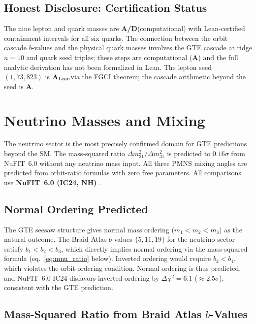 \documentclass[11pt,openany]{book}
\theoremstyle{remark}
\newcommand{\CatA}{\textbf{A}}
\newcommand{\CatAL}{\ensuremath{\textbf{A}_{\rm Lean}}}
\newcommand{\CatAD}{\textbf{A/D}}
\begin{document}
\subsection*{Honest Disclosure: Certification Status}

The nine lepton and quark masses are \CatAD (computational) with Lean-certified
containment intervals for all six quarks.  The connection between the orbit cascade
$b$-values and the physical quark masses involves the GTE cascade at ridge $n=10$
and quark seed triples; these steps are computational (\CatA) and the full analytic
derivation has not been formalized in Lean.  The lepton seed $(1,73,823)$ is
\CatAL via the FGCI theorem; the cascade arithmetic beyond the seed is \CatA.

\section{Neutrino Masses and Mixing}
\label{sec:neutrinos}

The neutrino sector is the most precisely confirmed domain for GTE predictions beyond
the SM.  The mass-squared ratio $\Delta m^2_{21}/\Delta m^2_{31}$ is predicted to
$0.16\sigma$ from NuFIT~6.0 without any neutrino mass input.  All three PMNS mixing
angles are predicted from orbit-ratio formulas with zero free parameters.
All comparisons use \textbf{NuFIT~6.0 (IC24, NH)} \cite{NuFIT60}.

\subsection*{Normal Ordering Predicted}

The GTE seesaw structure gives normal mass ordering ($m_1 < m_2 < m_3$) as the natural
outcome.  The Braid Atlas $b$-values $\{5, 11, 19\}$ for the neutrino sector satisfy
$b_1 < b_2 < b_3$, which directly implies normal ordering via the mass-squared formula
(eq.~\eqref{eq:mnu_ratio} below).  Inverted ordering would require $b_2 < b_1$, which
violates the orbit-ordering condition.  Normal ordering is thus predicted, and NuFIT~6.0
IC24 disfavors inverted ordering by $\Delta\chi^2 = 6.1$ ($\approx 2.5\sigma$), consistent with
the GTE prediction.

\subsection*{Mass-Squared Ratio from Braid Atlas $b$-Values}
\end{document}
